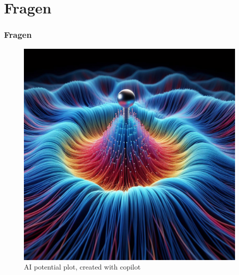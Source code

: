 \documentclass[xcolor=dvipsnames,envcountsect]{beamer}
\begin{document}
\section{Fragen}
\begin{frame}
	\frametitle{Fragen}
	\begin{figure}
		\includegraphics[width= 0.5\linewidth]{01_Pictures/ai.jpeg}
		\caption{AI potential plot, created with copilot}
	\end{figure}
\end{frame}
\end{document}
